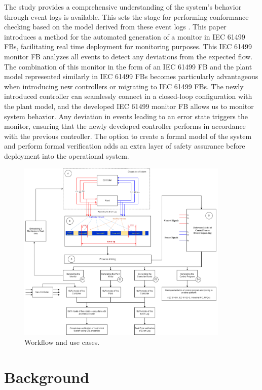 \documentclass{ieeeojies}
\begin{document}
The study provides a comprehensive understanding of the system's behavior through event logs is available. This sets the stage for performing conformance checking  based on the model derived from these event logs \cite{van2012replaying, munoz2016conformance}.  This paper introduces a method for the automated generation of a monitor in IEC 61499 FBs, facilitating real time deployment for monitoring purposes. This IEC 61499 monitor FB analyzes all events to detect any deviations from the expected flow.  The combination of this monitor in the form of an IEC 61499 FB and the plant model represented similarly in IEC 61499 FBs becomes particularly advantageous when introducing new controllers or migrating to IEC 61499 FBs. The newly introduced controller can seamlessly connect in a closed-loop configuration with the plant model, and the developed IEC 61499 monitor FB allows us to monitor system behavior. Any deviation in events leading to an error state triggers the monitor, ensuring that the newly developed controller performs in accordance with the previous controller. The option to create a formal model of the system and perform formal verification adds an extra layer of safety assurance before deployment into the operational system.




\begin{figure}[!t]
	\centering
	\includegraphics[width=0.9\textwidth]{images/workflow1.png}
	\caption{Workflow and use cases.}
	\label{workflowUsecase}
\end{figure}

\section{Background}
\label{background}
\end{document}
